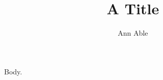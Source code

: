 \documentclass{amsproc}
\begin{document}
\title{A Title}
\author{Ann Able}
\maketitle
Body.
\end{document}
